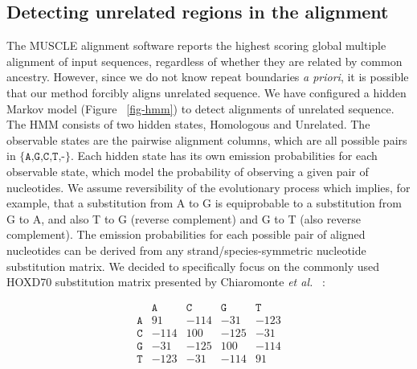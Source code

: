 \documentclass[12pt,journal,letterpaper,onecolumn, draftcls]{IEEEtran}
\begin{document}
\subsection{Detecting unrelated regions in the alignment}
\begin{figure*}[t!]
\centering {}
\caption[Hidden Markov model used to detect pairwise alignments of unrelated
sequence]%
{\textbf{Hidden Markov model used to detect pairwise alignments of unrelated
sequence.} The HMM has states which model alignment columns containing
homologous and unrelated sequence. Emission probabilities are extracted from the HOXD70 substitution matrix and correspond to alignment
columns, for example \texttt{AA} indicates A aligned to A.  gO
indicates gap-open and gE gap extend. Alignment columns are treated as
strand-symmetric, so that AC also indicates CA and the reverse
complements TG and GT.  The emission probabilities are adjusted to the G+C content of the input genome
as described in the text.  The values shown here correspond to a 47.5\% G+C genome.}
\label{fig-hmm}
\end{figure*}
The MUSCLE alignment software reports the highest scoring
global multiple alignment of input sequences, regardless of whether
they are related by common ancestry. However, since we do not know repeat boundaries \emph{a priori}, it is possible that our method forcibly aligns unrelated
sequence. We have configured a hidden Markov model (Figure
~\ref{fig-hmm}) to detect alignments of unrelated sequence. The HMM
consists of two hidden states, Homologous and Unrelated.  The
observable states are the pairwise alignment columns, which are all
possible pairs in $\texttt{{\{A,G,C,T,-\}}}$. Each hidden state has its own emission probabilities for each observable state, which model the probability of observing a given pair of nucleotides. We assume reversibility of the
evolutionary process which implies, for example, that a substitution from A to G is equiprobable to a substitution from G to A, and also T to G (reverse complement) and G to T (also reverse complement).   The emission probabilities for
each possible pair of aligned nucleotides can be derived from any strand/species-symmetric nucleotide substitution matrix.  We decided to specifically focus on the commonly used HOXD70 substitution matrix presented by Chiaromonte \textit{et al.}~\cite{hoxd} :
\begin{center}
\begin{equation}
\begin{array}{crrrr}
  & \texttt{A} & \texttt{C} & \texttt{G} & \texttt{T} \\
\texttt{A} & 91 & -114 & -31 & -123 \\
\texttt{C} & -114 & 100 & -125 & -31 \\
\texttt{G} & -31 & -125 & 100 & -114 \\
\texttt{T} & -123 & -31 & -114 & 91 \\ \end{array}
\end{equation}
\end{center}
\end{document}
